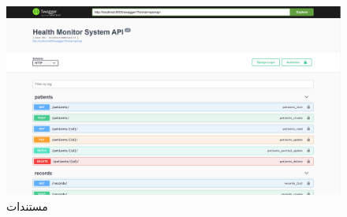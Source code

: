 \begin{figure}[h]
	\centering
	\includegraphics[width=1.0\textwidth]{figs/swagger.png}
	
	\caption{مستندات }
	\label{fig:8}
\end{figure}



